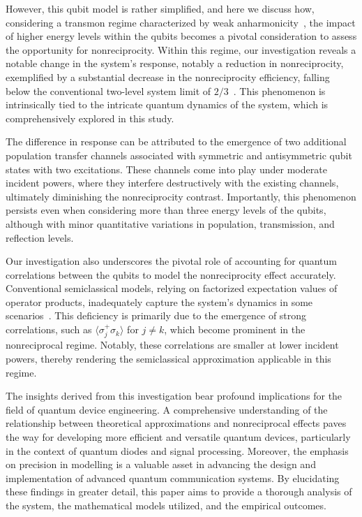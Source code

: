 \documentclass[lettersize,journal]{IEEEtran}
\begin{document}
However, this qubit model is rather simplified, and here we discuss how, considering a transmon regime characterized by weak anharmonicity~\cite{krantz_quantum_2019}, the impact of higher energy levels within the qubits becomes a pivotal consideration to assess the opportunity for nonreciprocity. Within this regime, our investigation reveals a notable change in the system's response, notably a reduction in nonreciprocity, exemplified by a substantial decrease in the nonreciprocity efficiency, falling below the conventional two-level system limit of $2/3$~\cite{muller_nonreciprocal_2017}. This phenomenon is intrinsically tied to the intricate quantum dynamics of the system, which is comprehensively explored in this study.

The difference in response can be attributed to the emergence of two additional population transfer channels associated with symmetric and antisymmetric qubit states with two excitations. These channels come into play under moderate incident powers, where they interfere destructively with the existing channels, ultimately diminishing the nonreciprocity contrast. Importantly, this phenomenon persists even when considering more than three energy levels of the qubits, although with minor quantitative variations in population, transmission, and reflection levels.

Our investigation also underscores the pivotal role of accounting for quantum correlations between the qubits to model the nonreciprocity effect accurately. Conventional semiclassical models, relying on factorized expectation values of operator products, inadequately capture the system's dynamics in some scenarios~\cite{carmichael1999statistical}. This deficiency is primarily due to the emergence of strong correlations, such as $\langle \sigma_j^+ \sigma_k \rangle$ for $j\neq k$, which become prominent in the nonreciprocal regime. Notably, these correlations are smaller at lower incident powers, thereby rendering the semiclassical approximation applicable in this regime.

The insights derived from this investigation bear profound implications for the field of quantum device engineering. A comprehensive understanding of the relationship between theoretical approximations and nonreciprocal effects paves the way for developing more efficient and versatile quantum devices, particularly in the context of quantum diodes and signal processing. Moreover, the emphasis on precision in modelling is a valuable asset in advancing the design and implementation of advanced quantum communication systems. By elucidating these findings in greater detail, this paper aims to provide a thorough analysis of the system, the mathematical models utilized, and the empirical outcomes.
\end{document}
